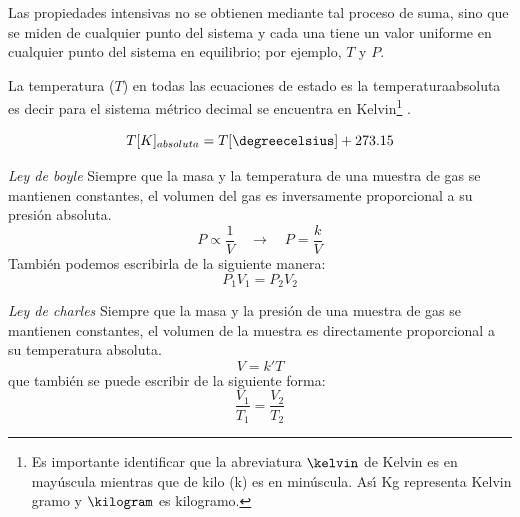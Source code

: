 Las propiedades intensivas no se obtienen mediante tal
proceso de su\-ma, sino que se miden de cualquier punto del sistema y cada una tiene un valor
uniforme en cualquier punto del sistema en equilibrio; por ejemplo, $T$ y $P$.

La temperatura ($T$) en todas las ecuaciones de estado es la  \gls{temperaturaabsoluta} es decir para el sistema m\'etrico decimal se encuentra en Kelvin\footnote{ Es importante identificar que la abreviatura $\kelvin$ de Kelvin es en may\'uscula mientras que de kilo (k) es en min\'uscula. As\'{\i} Kg representa Kelvin gramo y $\kilogram$ es kilogramo.} .

\begin{equation}
T[K]_{absoluta} = T[\degreecelsius] + 273.15
\end{equation}

\textit{Ley de \gls{boyle}}  Siempre que la masa
y la temperatura de una muestra de gas se mantienen constantes, el volumen del gas es
inversamente proporcional a su presi\'on absoluta.
\begin{equation}
P \propto \frac{1}{V} \quad{ \longrightarrow }\quad  P = \frac{k}{V}
\end{equation}
Tambi\'en podemos escribirla de la siguiente manera:
\begin{equation}
P_1 V_1 = P_2 V_2
\end{equation}

\textit{Ley de \gls{charles}} Siempre que la masa y la presi\'on de una muestra de gas se mantienen constantes, el volumen de la muestra es directamente proporcional a su temperatura absoluta.
\begin{equation}
V= k'T
\end{equation}
que tambi\'en se puede escribir de la siguiente forma:
\begin{equation}
\frac{V_1}{T_1} = \frac{V_2}{T_2}
\end{equation}

\vskip0.1in

